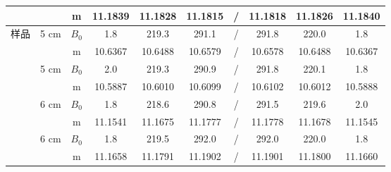 \documentclass[cn,hazy,pku,12pt,normal,math=newtx,cite=super]{elegantnote}
\begin{document}
\begin{table}[h]
\begin{tabular}{cccccccccc}
                           &                       & m     & 11.1839 & 11.1828 & 11.1815 & /   & 11.1818 & 11.1826 & 11.1840  \\\hline
    \multirow{8}{*}{样品}    & \multirow{2}{*}{5 cm} & $B_0$ & 1.8     & 219.3   & 291.1   & /   & 291.8   & 220.0     & 1.8     \\
                           &                       & m     & 10.6367 & 10.6488 & 10.6579 & /   & 10.6578 & 10.6488 & 10.6367 \\
                           & \multirow{2}{*}{5 cm} & $B_0$ & 2.0       & 219.3   & 290.9   & /   & 291.8   & 220.1   & 1.8     \\
                           &                       & m     & 10.5887 & 10.6010  & 10.6099 & /   & 10.6102 & 10.6012 & 10.5888 \\
                           & \multirow{2}{*}{6 cm} & $B_0$ & 1.8     & 218.6   & 290.8   & /   & 291.5   & 219.6   & 2.0       \\
                           &                       & m     & 11.1541 & 11.1675 & 11.1777 & /   & 11.1778 & 11.1678 & 11.1545 \\
                           & \multirow{2}{*}{6 cm} & $B_0$ & 1.8     & 219.5   & 292.0     & /   & 292.0     & 220.0     & 1.8     \\
                           &                       & m     & 11.1658 & 11.1791 & 11.1902 & /   & 11.1901 & 11.1800   & 11.1660  \\ \hline
    \end{tabular}
\end{table}
\end{document}
